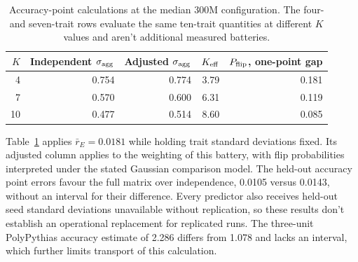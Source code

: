 \begin{table}[!htb]
\centering
\caption{Accuracy-point calculations at the median 300M configuration. The four- and seven-trait rows evaluate the same ten-trait quantities at different $K$ values and aren't additional measured batteries.}
\label{tab:original8}
\small\setlength{\tabcolsep}{4pt}\renewcommand{\arraystretch}{1.12}
\begin{tabular}{rrrrr}\toprule
$K$ & Independent $\sigma_{\rm agg}$ & Adjusted $\sigma_{\rm agg}$ & $K_{\rm eff}$ & $P_{\rm flip}$, one-point gap\\\midrule
4 & 0.754 & 0.774 & 3.79 & 0.181\\
7 & 0.570 & 0.600 & 6.31 & 0.119\\
10 & 0.477 & 0.514 & 8.60 & 0.085\\\bottomrule
\end{tabular}
\end{table}

Table~\ref{tab:original8} applies $\bar r_E=0.0181$ while holding trait standard deviations fixed. Its adjusted column applies to the weighting of this battery, with flip probabilities interpreted under the stated Gaussian comparison model. The held-out accuracy point errors favour the full matrix over independence, 0.0105 versus 0.0143, without an interval for their difference. Every predictor also receives held-out seed standard deviations unavailable without replication, so these results don't establish an operational replacement for replicated runs. The three-unit PolyPythias accuracy estimate of 2.286 differs from 1.078 and lacks an interval, which further limits transport of this calculation.

